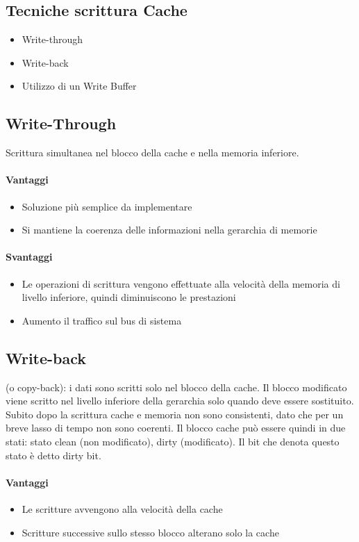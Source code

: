 \documentclass[12pt, a4paper, openany]{book}
\begin{document}
\subsection*{Tecniche scrittura Cache}
\begin{itemize}
    \item Write-through
    \item Write-back
    \item Utilizzo di un Write Buffer
\end{itemize}

\subsection*{Write-Through} Scrittura simultanea nel blocco della cache e nella
memoria inferiore.
\paragraph*{Vantaggi}
\begin{itemize}
    \item Soluzione più semplice da implementare
    \item Si mantiene la coerenza delle informazioni nella gerarchia di memorie
\end{itemize} 

\paragraph*{Svantaggi}
\begin{itemize}
    \item Le operazioni di scrittura vengono effettuate alla velocità della memoria
    di livello inferiore, quindi diminuiscono le prestazioni
    \item Aumento il traffico sul bus di sistema
\end{itemize}

\subsection*{Write-back} (o copy-back): i dati sono scritti solo nel blocco della cache.
Il blocco modificato viene scritto nel livello inferiore della gerarchia solo quando
deve essere sostituito. Subito dopo la scrittura cache e memoria non sono consistenti,
dato che per un breve lasso di tempo non sono coerenti.
Il blocco cache può essere quindi in due stati: stato clean (non modificato), dirty (modificato).
Il bit che denota questo stato è detto dirty bit.
\paragraph*{Vantaggi}
\begin{itemize}
    \item Le scritture avvengono alla velocità della cache
    \item Scritture successive sullo stesso blocco alterano solo la cache
\end{itemize}
\end{document}
